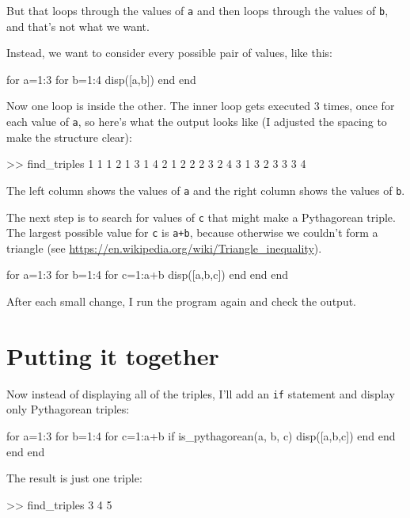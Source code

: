 But that loops through the values of {\tt a} and then loops through the values of {\tt b}, and that's not what we want.

Instead, we want to consider every possible pair of values, like this:

\begin{code}
for a=1:3
    for b=1:4
        disp([a,b])
    end
end
\end{code}

Now one loop is inside the other.  The inner loop gets executed 3 times, once for each value of {\tt a}, so here's what the output looks like (I adjusted the spacing to make
the structure clear):

\begin{code}
>> find_triples
     1     1
     1     2
     1     3
     1     4
     2     1
     2     2
     2     3
     2     4
     3     1
     3     2
     3     3
     3     4
\end{code}

The left column shows the values of {\tt a} and the right column shows the values of {\tt b}.

The next step is to search for values of {\tt c} that might make a Pythagorean triple.  The largest possible value for {\tt c} is {\tt a+b}, because otherwise we couldn't form a triangle 
(see \url{https://en.wikipedia.org/wiki/Triangle_inequality}).

\begin{code}
for a=1:3
    for b=1:4
        for c=1:a+b
            disp([a,b,c])
        end
    end
end
\end{code}

After each small change, I run the program again and check the output.

\section{Putting it together}

Now instead of displaying all of the triples, I'll add an {\tt if} statement and display only Pythagorean triples:

\begin{code}
for a=1:3
    for b=1:4
        for c=1:a+b
            if is_pythagorean(a, b, c)
                disp([a,b,c])
            end
        end
    end
end
\end{code}

The result is just one triple:

\begin{code}
>> find_triples
     3     4     5
\end{code}

